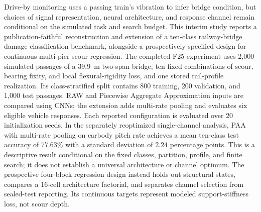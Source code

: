 Drive-by monitoring uses a passing train's vibration to infer bridge
condition, but choices of signal representation, neural architecture, and
response channel remain conditional on the simulated task and search budget.
This interim study reports a publication-faithful reconstruction and extension
of a ten-class railway-bridge damage-classification benchmark, alongside a
prospectively specified design for continuous multi-pier scour regression.
The completed F25 experiment uses 2,000 simulated passages of a 39.9~m
two-span bridge, ten fixed combinations of scour, bearing fixity, and local
flexural-rigidity loss, and one stored rail-profile realization. Its
class-stratified split contains 800 training, 200 validation, and 1,000 test
passages. RAW and Piecewise Aggregate Approximation inputs are compared using
CNNs; the extension adds multi-rate pooling and evaluates six eligible vehicle
responses. Each reported configuration is evaluated over 20 initialization
seeds. In the separately reoptimized single-channel analysis, PAA with
multi-rate pooling on carbody pitch rate achieves a mean ten-class test
accuracy of $77.63\%$ with a standard deviation of $2.24$ percentage points.
This is a descriptive result conditional on the fixed classes, partition,
profile, and finite search; it does not establish a universal architecture or
channel optimum. The prospective four-block regression design instead holds
out structural states, compares a 16-cell architecture factorial, and separates
channel selection from sealed-test reporting. Its continuous targets represent
modeled support-stiffness loss, not scour depth.
